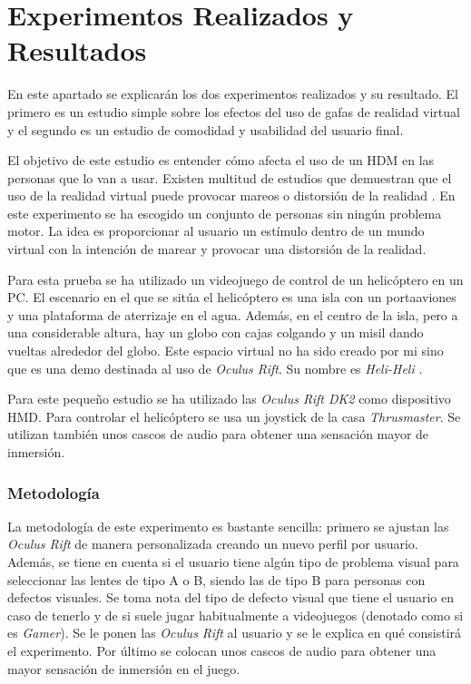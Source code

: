 \chapter{Experimentos Realizados y Resultados}
\label{chap:experimentos}

En este apartado se explicar\'an los dos experimentos realizados y su resultado. El primero es un estudio simple sobre los efectos del uso de gafas de realidad virtual y el segundo es un estudio de comodidad y usabilidad del usuario final.

\label{sect:rv_sickness}

El objetivo de este estudio es entender c\'omo afecta el uso de un HDM en las personas que lo van a usar. Existen multitud de estudios que demuestran que el uso de la realidad virtual puede provocar mareos o distorsi\'on de la realidad \citep{article:VRSickness}. En este experimento se ha escogido un conjunto de personas sin ning\'un problema motor. La idea es proporcionar al usuario un est\'imulo dentro de un mundo virtual con la intenci\'on de marear y provocar una distorsi\'on de la realidad.

Para esta prueba se ha utilizado un videojuego de control de un helic\'optero en un PC. El escenario en el que se sit\'ua el helic\'optero es una isla con un portaaviones y una plataforma de aterrizaje en el agua. Adem\'as, en el centro de la isla, pero a una considerable altura, hay un globo con cajas colgando y un misil dando vueltas alrededor del globo. Este espacio virtual no ha sido creado por mi sino que es una demo destinada al uso de \emph{Oculus Rift}. Su nombre es \emph{Heli-Heli} \citep{article:HeliHeli}.

Para este peque\~no estudio se ha utilizado las \emph{Oculus Rift DK2} como dispositivo HMD. Para controlar el helic\'optero se usa un joystick de la casa \emph{Thrusmaster}. Se utilizan tambi\'en unos cascos de audio para obtener una sensaci\'on mayor de inmersi\'on.

\subsection{Metodolog\'ia}
La metodolog\'ia de este experimento es bastante sencilla: primero se ajustan las \emph{Oculus Rift} de manera personalizada creando un nuevo perfil por usuario. Adem\'as, se tiene en cuenta si el usuario tiene alg\'un tipo de problema visual para seleccionar las lentes de tipo A o B, siendo las de tipo B para personas con defectos visuales. Se toma nota del tipo de defecto visual que tiene el usuario en caso de tenerlo y de si suele jugar habitualmente a videojuegos (denotado como si es \emph{Gamer}). Se le ponen las \emph{Oculus Rift} al usuario y se le explica en qu\'e consistir\'a el experimento. Por \'ultimo se colocan unos cascos de audio para obtener una mayor sensaci\'on de inmersi\'on en el juego.

